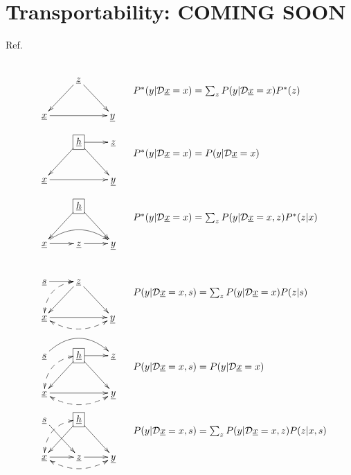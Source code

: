 \chapter{Transportability: COMING SOON}
\label{ch-transport}

Ref.\cite{pearl2011trans}

\begin{figure}[h!]
$$
\begin{array}{ll}
\xymatrix{
&\rvz\ar[dl]\ar[dr]
\\
\rvx\ar[rr]&&\rvy
}
&
\begin{array}{l}
\\
\\
P^*(y|\cald \rvx=x)=
\sum_z
P(y|\cald \rvx=x)P^*(z)
\end{array}
\\
\xymatrix{
&*+[F]{\rvh}\ar[dl]\ar[dr]\ar[r]
&\rvz
\\
\rvx\ar[rr]&&\rvy
}
&
\begin{array}{l}
\\
\\
P^*(y|\cald \rvx=x)=
P(y|\cald \rvx=x)
\end{array}
\\
\xymatrix{
&*+[F]{\rvh}\ar[dl]\ar[dr]
\\
\rvx\ar[r]\ar@/^1.2pc/[rr]
&\rvz\ar[r]&\rvy
}
&
\begin{array}{l}
\\
\\
P^*(y|\cald \rvx=x)=
\sum_z
P(y|\cald \rvx=x, z)P^*(z|x)
\end{array}
\end{array}
$$
\end{figure}


\begin{figure}[h!]
$$
\begin{array}{ll}
\xymatrix{
\rvs\ar[r]
&\rvz\ar[dl]\ar[dr]\ar@{<-->}@/_1pc/[dl]
\\
\rvx\ar[rr]\ar@{<-->}@/_1pc/[rr]
&&\rvy
}
&
\begin{array}{l}
\\
\\
P(y|\cald \rvx=x, s)=
\sum_z
P(y|\cald \rvx=x)P(z|s)
\end{array}
\\
\\
\xymatrix{
\rvs\ar@/^1.5pc/[rr]
&*+[F]{\rvh}\ar[dl]\ar[dr]\ar[r]
\ar@{<-->}@/_1pc/[dl]
&\rvz
\\
\rvx\ar[rr]\ar@{<-->}@/_1pc/[rr]
&&\rvy
}
&
\begin{array}{l}
\\
\\
P(y|\cald \rvx=x, s)=
P(y|\cald \rvx=x)
\end{array}
\\
\xymatrix{
\rvs\ar[rd]
&*+[F]{\rvh}\ar[dl]\ar[dr]
\ar@{<-->}@/_1pc/[dl]
\\
\rvx\ar[r]\ar@{<-->}@/_1pc/[rr]
&\rvz\ar[r]
&\rvy
}
&
\begin{array}{l}
\\
\\
P(y|\cald \rvx=x, s)=
\sum_z
P(y|\cald \rvx=x, z)P(z|x, s)
\end{array}
\end{array}
$$
\end{figure}
